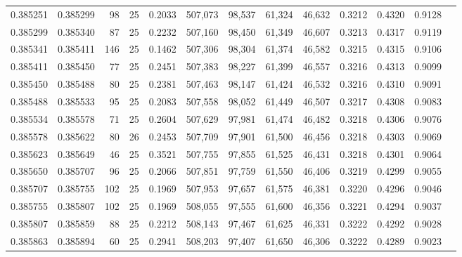 \begin{tabular}{rrrrrrrrrrrrr}
0.385251 & 0.385299 &    98 &  25 &                                     0.2033 & 507,073 &  98,537 &  61,324 &  46,632 & 0.3212 & 0.4320 & 0.9128 \\
0.385299 & 0.385340 &    87 &  25 &                                     0.2232 & 507,160 &  98,450 &  61,349 &  46,607 & 0.3213 & 0.4317 & 0.9119 \\
0.385341 & 0.385411 &   146 &  25 &                                     0.1462 & 507,306 &  98,304 &  61,374 &  46,582 & 0.3215 & 0.4315 & 0.9106 \\
0.385411 & 0.385450 &    77 &  25 &                                     0.2451 & 507,383 &  98,227 &  61,399 &  46,557 & 0.3216 & 0.4313 & 0.9099 \\
0.385450 & 0.385488 &    80 &  25 &                                     0.2381 & 507,463 &  98,147 &  61,424 &  46,532 & 0.3216 & 0.4310 & 0.9091 \\
0.385488 & 0.385533 &    95 &  25 &                                     0.2083 & 507,558 &  98,052 &  61,449 &  46,507 & 0.3217 & 0.4308 & 0.9083 \\
0.385534 & 0.385578 &    71 &  25 &                                     0.2604 & 507,629 &  97,981 &  61,474 &  46,482 & 0.3218 & 0.4306 & 0.9076 \\
0.385578 & 0.385622 &    80 &  26 &                                     0.2453 & 507,709 &  97,901 &  61,500 &  46,456 & 0.3218 & 0.4303 & 0.9069 \\
0.385623 & 0.385649 &    46 &  25 &                                     0.3521 & 507,755 &  97,855 &  61,525 &  46,431 & 0.3218 & 0.4301 & 0.9064 \\
0.385650 & 0.385707 &    96 &  25 &                                     0.2066 & 507,851 &  97,759 &  61,550 &  46,406 & 0.3219 & 0.4299 & 0.9055 \\
0.385707 & 0.385755 &   102 &  25 &                                     0.1969 & 507,953 &  97,657 &  61,575 &  46,381 & 0.3220 & 0.4296 & 0.9046 \\
0.385755 & 0.385807 &   102 &  25 &                                     0.1969 & 508,055 &  97,555 &  61,600 &  46,356 & 0.3221 & 0.4294 & 0.9037 \\
0.385807 & 0.385859 &    88 &  25 &                                     0.2212 & 508,143 &  97,467 &  61,625 &  46,331 & 0.3222 & 0.4292 & 0.9028 \\
0.385863 & 0.385894 &    60 &  25 &                                     0.2941 & 508,203 &  97,407 &  61,650 &  46,306 & 0.3222 & 0.4289 & 0.9023 \\

\end{tabular}
